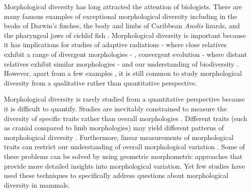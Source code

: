 \documentclass[12pt,a4paper]{article}
\begin{document}
	Morphological diversity has long attracted the attention of biologists.
    There are many famous examples of exceptional morphological diversity including in the beaks of Darwin's finches, the body and limbs of Caribbean \textit{Anolis} lizards, and the pharyngeal jaws of cichlid fish \citep{Gavrilets2009}. %
	Morphological diversity is important because it has implications for studies of adaptive radiations - where close relatives exhibit a range of divergent morphologies - \citep{Losos2010}, convergent evolution - where distant relatives exhibit similar morphologies - \citep[e.g.][]{Muschick2012, Harmon2005} and our understanding of biodiversity \citep{Roy1997}.
	However, apart from a few examples \citep[e.g.][]{Goswami2011, Ruta2013, Brusatte2008}, it is still common to study morphological diversity from a qualitative rather than quantitative perspective.


	

	Morphological diversity is rarely studied from a quantitative perspective because it is difficult to quantify. Studies are inevitably constrained to measure the diversity of specific traits rather than overall morphologies \citep{Roy1997}. Different traits (such as cranial compared to limb morphologies) may yield different patterns of morphological diversity \citep{Foth2012}. %
	Furthermore, linear measurements of morphological traits can restrict our understanding of overall morphological variation \citep{Rohlf1993} %
	. Some of these problems can be solved by using geometric morphometric approaches \citep{Rohlf1993, Adams2013} that provide more detailed insights into morphological variation. Yet few studies have used these techniques to specifically address questions about morphological diversity in mammals.
\end{document}
